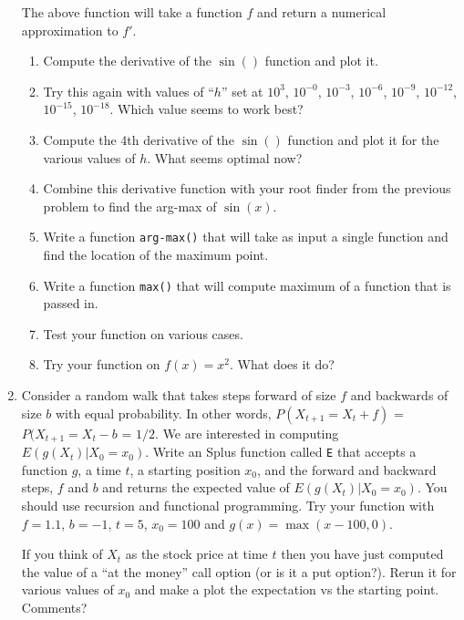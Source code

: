 \begin{enumerate}
The above function will take a function $f$ and return a numerical
approximation to $f'$.
\begin{enumerate} 
\item Compute the derivative of the $\sin()$ function and plot it.
\item Try this again with values of ``$h$'' set at $10^3$, $10^{-0}$,
$10^{-3}$, $10^{-6}$, $10^{-9}$, $10^{-12}$, $10^{-15}$, $10^{-18}$.
Which value seems to work best?  
\item Compute the 4th derivative of the $\sin()$ function and plot
it for the various values of $h$.  What seems optimal now?
\item Combine this derivative function with your root finder from the
previous problem to find the arg-max of $\sin(x)$.
\item Write a function {\tt arg-max()} that will take as input a
single function and find the location of the maximum point.
\item Write a function {\tt max()} that will compute maximum of a
function that is passed in.
\item Test your function on various cases.
\item Try your function on $f(x) = x^2$.  What does it do?  
\end{enumerate}
\item Consider a random walk that takes steps forward of size $f$ and
backwards of size $b$ with equal probability.  In other words,
$P(X_{t+1} = X_t + f)$ = $P(X_{t+1} = X_t -b$ = $1/2$.  We are
interested in computing $E(g(X_t)|X_0=x_0)$.  Write an Splus function
called {\tt E} that accepts a function $g$, a time $t$, a starting
position $x_0$, and the forward and backward steps, $f$ and $b$ and
returns the expected value of $E(g(X_t)|X_0=x_0)$.  You should use
recursion and functional programming.  Try your function with $f =
1.1$, $b = -1$, $t = 5$, $x_0 = 100$ and $g(x) = \max(x-100,0)$.  

If you think of $X_t$ as the stock price at time $t$ then you have
just computed the value of a ``at the money'' call option (or is it a
put option?).  Rerun it for various values of $x_0$ and make a plot
the expectation vs the starting point.  Comments?
\end{enumerate}


